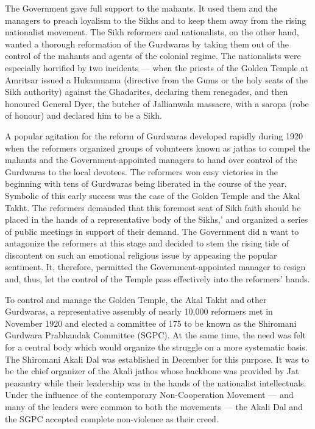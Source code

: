 \begin{multicols}{2}
The Government gave full support to the mahants. It used them and the managers to preach loyalism to the Sikhs and to keep them away from the rising nationalist movement. The Sikh reformers and nationalists, on the other hand, wanted a thorough reformation of the Gurdwaras by taking them out of the control of the mahants and agents of the colonial regime. The nationalists were especially horrified by two incidents --- when the priests of the Golden Temple at Amritsar issued a Hukamnama (directive from the Gums or the holy seats of the Sikh authority) against the Ghadarites, declaring them renegades, and then honoured General Dyer, the butcher of Jallianwala massacre, with a saropa (robe of honour) and declared him to be a Sikh.

A popular agitation for the reform of Gurdwaras developed rapidly during 1920 when the reformers organized groups of volunteers known as jathas to compel the mahants and the Government-appointed managers to hand over control of the Gurdwaras to the local devotees. The reformers won easy victories in the beginning with tens of Gurdwaras being liberated in the course of the year. Symbolic of this early success was the case of the Golden Temple and the Akal Takht. The reformers demanded that this foremost seat of Sikh faith should be placed in the hands of a representative body of the Sikhs,' and organized a series of public meetings in support of their demand. The Government did n want to antagonize the reformers at this stage and decided to stem the rising tide of discontent on such an emotional religious issue by appeasing the popular sentiment. It, therefore, permitted the Government-appointed manager to resign and, thus, let the control of the Temple pass effectively into the reformers' hands.

To control and manage the Golden Temple, the Akal Takht and other Gurdwaras, a representative assembly of nearly 10,000 reformers met in November 1920 and elected a committee of 175 to be known as the Shiromani Gurdwara Prabhandak Committee (SGPC). At the same time, the need was felt for a central body which would organize the struggle on a more systematic basis. The Shiromani Akali Dal was established in December for this purpose. It was to be the chief organizer of the Akali jathos whose backbone was provided by Jat peasantry while their leadership was in the hands of the nationalist intellectuals. Under the influence of the contemporary Non-Cooperation Movement --- and many of the leaders were common to both the movements --- the Akali Dal and the SGPC accepted complete non-violence as their creed.


\end{multicols}
